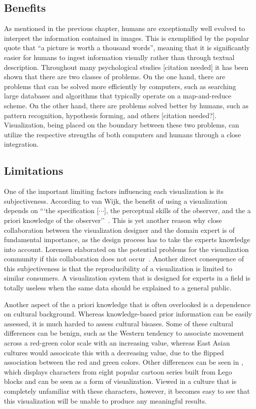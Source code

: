 \subsection{Benefits} \label{cha:intro:vis:benefits}
As mentioned in the previous chapter, humans are exceptionally well evolved to interpret the information contained in images.  This is exemplified by the popular quote that ``a picture is worth a thousand words'', meaning that it is significantly easier for humans to ingest information visually rather than through textual description.  Throughout many psychological studies [citation needed] it has been shown that there are two classes of problems.  On the one hand, there are problems that can be solved more efficiently by computers, such as searching large databases and algorithms that typically operate on a map-and-reduce scheme.  On the other hand, there are problems solved better by humans, such as pattern recognition, hypothesis forming, and others [citation needed?].  Visualization, being placed on the boundary between these two problems, can utilize the respective strengths of both computers and humans through a close integration.

\subsection{Limitations} \label{cha:intro:vis:limitations}
One of the important limiting factors influencing each visualization is its subjectiveness.  According to van Wijk, the benefit of using a visualization depends on ```the specification [$\cdots$], the perceptual skills of the observer, and the a priori knowledge of the observer''~\cite{van2005value}.  This is yet another reason why close collaboration between the visualization designer and the domain expert is of fundamental importance, as the design process has to take the experts knowledge into account.  Lorensen elaborated on the potential problems for the visualization community if this collaboration does not occur~\cite{lorensen2004death}.  Another direct consequence of this subjectiveness is that the reproducibility of a visualization is limited to similar consumers.  A visualization system that is designed for experts in a field is totally useless when the same data should be explained to a general public.  

Another aspect of the a priori knowledge that is often overlooked is a dependence on cultural background.  Whereas knowledge-based prior information can be easily assessed, it is much harded to assess cultural bisases.  Some of these cultural differences can be benign, such as the Western tendency to associate movement across a red-green color scale with an increasing value, whereas East Asian cultures would associcate this with a decreasing value, due to the flipped association between the red and green colors.  Other differences can be seen in , which displays characters from eight popular cartoon series built from Lego blocks and can be seen as a form of visualization.  Viewed in a culture that is completely unfamiliar with these characters, however, it becomes easy to see that this visualization will be unable to produce any meaningful results.

